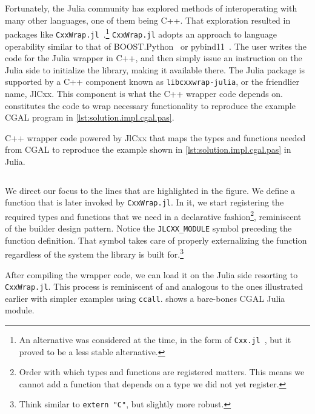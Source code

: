 Fortunately, the Julia community has explored methods of interoperating with
many other languages, one of them being C++.  That exploration resulted in
packages like \texttt{CxxWrap.jl}~\cite{Janssens:2021:CxxWrap.jl}.\footnote{An
alternative was considered at the time, in the form of
\texttt{Cxx.jl}~\cite{Fischer:2019:Cxx.jl}, but it proved to be a less stable
alternative.} \texttt{CxxWrap.jl} adopts an approach to language operability
similar to that of BOOST.Python~\cite{Abrahams:2003:BHSBP} or
pybind11~\cite{Wenzel:2017:pybind11}.  The user writes the code for the Julia
wrapper in C++, and then simply issue an instruction on the Julia side to
initialize the library, making it available there.  The Julia package is
supported by a C++ component known as \texttt{libcxxwrap-julia}, or the
friendlier name, JlCxx. This component is what the C++ wrapper code depends on.
 constitutes the code to wrap necessary
functionality to reproduce the example \ac{CGAL} program in
\cref{lst:solution.impl.cgal.pas}.

\begin{listing}[p]
  \caption[Wrapper CxxWrap code for Three points and one segment]{
    C++ wrapper code powered by JlCxx that maps the types and functions needed
    from \acs{CGAL} to reproduce the example shown in
    \cref{lst:solution.impl.cgal.pas} in Julia.}%
  \label{lst:solution.impl.jlcgal.jlcxx}
  \inputminted[fontsize=\small,highlightlines={24,30-34,36-38,40-43,46-49}]%
    {cpp}{cpp/cgal_julia.cpp}
\end{listing}

We direct our focus to the lines that are highlighted in the figure.  We define
a function that is later invoked by \texttt{CxxWrap.jl}.  In it, we start
registering the required types and functions that we need in a declarative
fashion\footnote{Order with which types and functions are registered matters.
This means we cannot add a function that depends on a type we did not yet
register.}, reminiscent of the builder design pattern.  Notice the
\texttt{JLCXX\_MODULE} symbol preceding the function definition.  That symbol
takes care of properly externalizing the function regardless of the system the
library is built for.\footnote{Think similar to \texttt{extern "C"}, but
slightly more robust.}

After compiling the wrapper code, we can load it on the Julia side resorting to
\texttt{CxxWrap.jl}.  This process is reminiscent of and analogous to the ones
illustrated earlier with simpler examples using \texttt{ccall}.
 shows a bare-bones CGAL Julia module.


